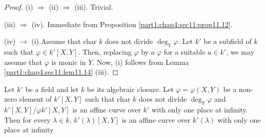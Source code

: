 \begin{proof}
  (i) $\Rightarrow$ (ii) $\Rightarrow$ (iii). Trivial.

  (iii) $\Rightarrow$ (iv). Immediate from Proposition
  \ref{part1:chap4:sec11:prop11.12}.

  (iv) $\rightarrow$ (i).\pageoriginale Assume that char $k$ does not divide $\deg_Y
  \varphi$. Let $k'$ be a subfield of $k$ such that $\varphi \in k'
         [X, Y]$. Then, replacing $\varphi$ by $a \; \varphi$ for a
         suitable $a \in k'$, we may assume that $\varphi$ is monic in
         $Y$. Now, (i) follows from Lemma
         \ref{part1:chap4:sec11:lem11.14} (iii).
\end{proof}

\begin{coro}\label{part1:chap4:sec11:coro11.16}
  Let $k'$ be a field and let $k$ be its algebraic closure. Let
  $\varphi= \varphi(X, Y)$ be a non-zero element of $k'[X, Y]$ such
  that char $k$ does not divide $\deg_Y \varphi$ and $k'[X, Y]/\varphi
  k'[X, Y]$ is an affine curve over $k'$ with only one place at
  infinity. Then for every $\lambda \in k$, $k' (\lambda) [X, Y]$ is
  an affine curve over $k' (\lambda)$ with only one place at infinity
\end{coro}

